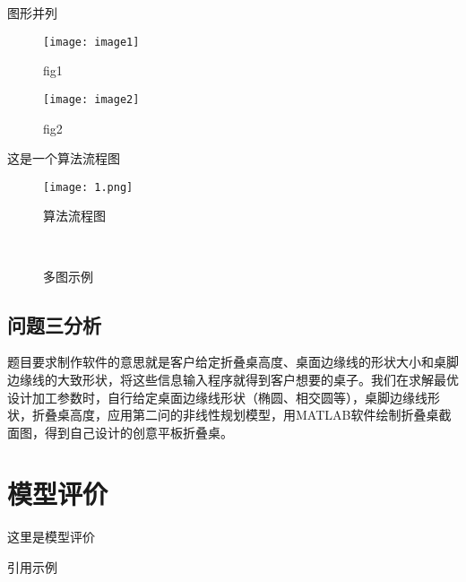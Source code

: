 \documentclass[bwprint]{gmcmthesis}
\numberwithin{equation}{section}
\numberwithin{figure}{section}
\numberwithin{table}{section}
\begin{document}
图形并列
\begin{figure}[htp!]
\begin{minipage}[t]{0.48\linewidth}
\centering
\texttt{[image: image1]}
\caption{fig1}
\label{fig:side:a}
\end{minipage}%
\begin{minipage}[t]{0.48\linewidth}
\centering
\texttt{[image: image2]}  %
\caption{fig2}
\label{fig:side:b}
\end{minipage}
\end{figure}

这是一个算法流程图
\begin{figure}[htp!]
\centering
\texttt{[image: 1.png]}
\caption{算法流程图}
\end{figure}

\clearpage
\begin{figure}[!htp]
	\centering
	\qquad
	 \\
	\qquad
	\caption{多图示例}
\end{figure}


\subsection{问题三分析}


题目要求制作软件的意思就是客户给定折叠桌高度、桌面边缘线的形状大小和桌脚边缘线的大致形状，将这些信息输入程序就得到客户想要的桌子。我们在求解最优设计加工参数时，自行给定桌面边缘线形状（椭圆、相交圆等），桌脚边缘线形状，折叠桌高度，应用第二问的非线性规划模型，用MATLAB软件绘制折叠桌截面图，得到自己设计的创意平板折叠桌。


\section{模型评价}

这里是模型评价





引用示例
\cite{mittelbach_latex_2004,wright_latex3_2009,beeton_unicode_2008,vieth_experiences_2009}
\end{document}
